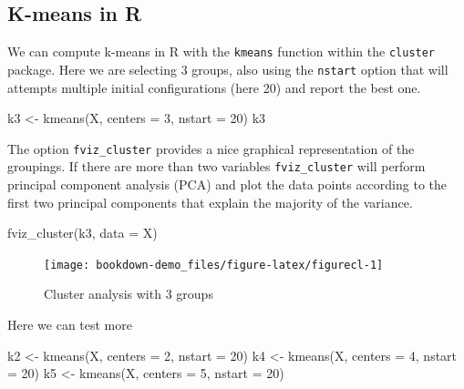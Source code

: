 \documentclass[
]{book}
\newenvironment{Shaded}{\begin{snugshade}}{\end{snugshade}}
\newcommand{\AttributeTok}[1]{\textcolor[rgb]{0.77,0.63,0.00}{#1}}
\newcommand{\DecValTok}[1]{\textcolor[rgb]{0.00,0.00,0.81}{#1}}
\newcommand{\FunctionTok}[1]{\textcolor[rgb]{0.00,0.00,0.00}{#1}}
\newcommand{\NormalTok}[1]{#1}
\newcommand{\OtherTok}[1]{\textcolor[rgb]{0.56,0.35,0.01}{#1}}
\begin{document}
\hypertarget{k-means-in-r}{%
\subsection{K-means in R}\label{k-means-in-r}}

We can compute k-means in R with the \texttt{kmeans} function within the \texttt{cluster} package. Here we are selecting 3 groups, also using the \texttt{nstart} option that will attempts multiple initial configurations (here 20) and report the best one.

\begin{Shaded}
\begin{Highlighting}[]
\NormalTok{k3 }\OtherTok{\textless{}{-}} \FunctionTok{kmeans}\NormalTok{(X, }\AttributeTok{centers =} \DecValTok{3}\NormalTok{, }\AttributeTok{nstart =} \DecValTok{20}\NormalTok{)}
\NormalTok{k3}
\end{Highlighting}
\end{Shaded}

The option \texttt{fviz\_cluster} provides a nice graphical representation of the groupings. If there are more than two variables \texttt{fviz\_cluster} will perform principal component analysis (PCA) and plot the data points according to the first two principal components that explain the majority of the variance.

\begin{Shaded}
\begin{Highlighting}[]
\FunctionTok{fviz\_cluster}\NormalTok{(k3, }\AttributeTok{data =}\NormalTok{ X)}
\end{Highlighting}
\end{Shaded}

\begin{figure}[H]

{\centering \texttt{[image: bookdown-demo\_files/figure-latex/figurecl-1]} 

}

\caption{Cluster analysis with 3 groups}\label{fig:figurecl}
\end{figure}

Here we can test more

\begin{Shaded}
\begin{Highlighting}[]
\NormalTok{k2 }\OtherTok{\textless{}{-}} \FunctionTok{kmeans}\NormalTok{(X, }\AttributeTok{centers =} \DecValTok{2}\NormalTok{, }\AttributeTok{nstart =} \DecValTok{20}\NormalTok{)}
\NormalTok{k4 }\OtherTok{\textless{}{-}} \FunctionTok{kmeans}\NormalTok{(X, }\AttributeTok{centers =} \DecValTok{4}\NormalTok{, }\AttributeTok{nstart =} \DecValTok{20}\NormalTok{)}
\NormalTok{k5 }\OtherTok{\textless{}{-}} \FunctionTok{kmeans}\NormalTok{(X, }\AttributeTok{centers =} \DecValTok{5}\NormalTok{, }\AttributeTok{nstart =} \DecValTok{20}\NormalTok{)}
\end{Highlighting}
\end{Shaded}
\end{document}
